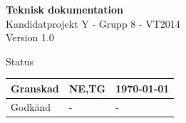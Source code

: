\documentclass[a4paper,12pt,fleqn]{article}
\begin{document}
	\pagestyle{fancy}
	\vspace*{\fill}
		\begingroup
			\begin{center}
				\huge{\textbf{Teknisk dokumentation}}
				\\
				\vspace{5pt}
				\normalsize
				Kandidatprojekt Y - Grupp 8 - VT2014
				\\
				Version 1.0
				\end{center}
		\endgroup
	\vspace*{\fill}
	
	\begin{center} %
		Status
		\\
		\vspace{3pt} %
	    \begin{tabular}{| p{3cm} | p{3cm} | p{3cm} |} %
	    \hline %
	    Granskad & NE,TG & \today \\ \hline %
		Godkänd & - & - \\ \hline %

	    \end{tabular}
	\end{center}
	\vspace{2cm}
	\newpage
	
\end{document}
